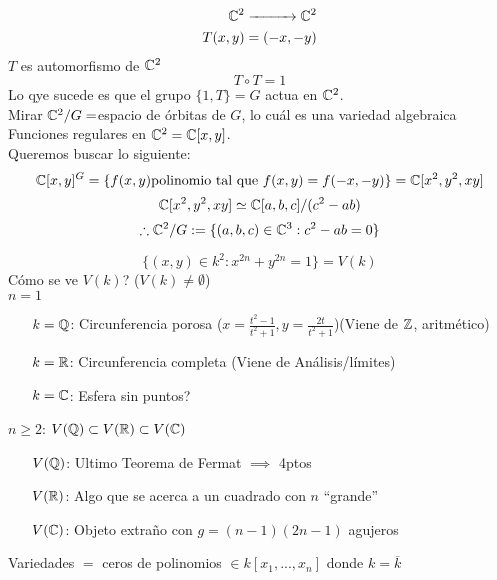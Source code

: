 
\begin{ejm}
    \begin{align*}
        \set{C}^2\xrightarrow{\makebox[1cm]{}}\set{C}^2 \\
        T(x,y)=(-x,-y)
    \end{align*}
    $T$ es automorfismo de $\mathbb{C}^2$
    \[T\circ T=1\]%
    Lo qye sucede es que el grupo $\{1,T\}=G$ actua en $\mathbb{C}^2$.\\
    Mirar $\mathbb{C}^2/G=$espacio de órbitas de $G$, lo cuál es una variedad algebraica\\
    Funciones regulares en $\mathbb{C}^2=\mathbb{C}[x,y]$.\\
    Queremos buscar lo siguiente:
    \[\mathbb{C}[x,y]^G=\{f(x,y)\text{polinomio tal que }f(x,y)=f(-x,-y)\}=\mathbb{C}[x^2,y^2,xy]\]
    \[\mathbb{C}[x^2,y^2,xy]\simeq\mathbb{C}[a,b,c]/(c^2-ab)\]
    \[\therefore\mathbb{C}^2/G:=\{(a,b,c)\in\mathbb{C}^3:c^2-ab=0\}\]
\end{ejm}
\begin{ejm}
    \[\{(x,y)\in k^2: x^{2n}+y^{2n}=1\}=V(k)\]
    Cómo se ve $V(k)$? ($V(k)\neq\emptyset$)\\
    $n=1$
    \begin{itemize}
        \item[$k=\mathbb{Q}$:] Circunferencia porosa ($x=\frac{t^2-1}{t^2+1}, y=\frac{2t}{t^2+1}$)(Viene de $\mathbb{Z}$, aritmético) %
        \item[$k=\mathbb{R}$:] Circunferencia completa (Viene de Análisis/límites) %
        \item[$k=\mathbb{C}$:] Esfera sin puntos? %
    \end{itemize}
    $n\geq2$: $V(\mathbb{Q})\subset V(\mathbb{R})\subset V(\mathbb{C})$
    \begin{itemize}
        \item[$V(\mathbb{Q})$:] Ultimo Teorema de Fermat $\implies$ 4ptos %
        \item[$V(\mathbb{R})$:] Algo que se acerca a un cuadrado con $n$ ``grande''%
        \item[$V(\mathbb{C})$:] Objeto extraño con $g=(n-1)(2n-1)$ agujeros %
    \end{itemize}
    Variedades $=$ ceros de polinomios $\in k[x_1,...,x_n]$ donde $k=\overline{k}$
\end{ejm}
